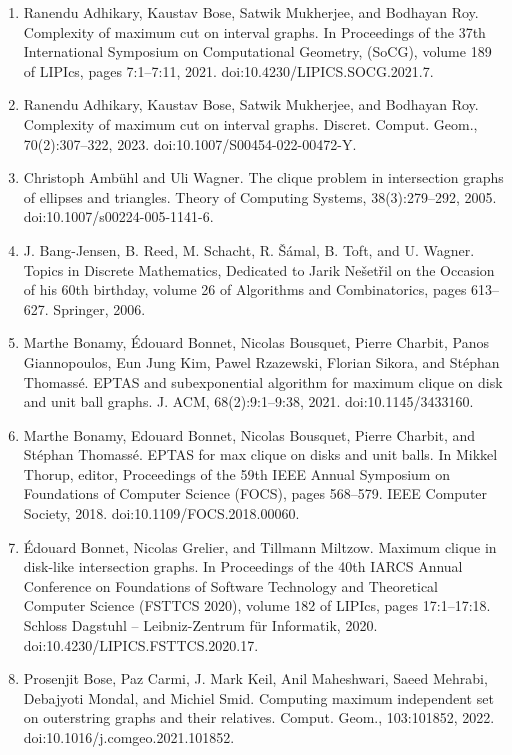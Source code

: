 \documentclass[10pt,a4paper]{amsart}
\begin{document}
\begin{enumerate}
\item[]  [1]  Ranendu Adhikary, Kaustav Bose, Satwik Mukherjee, and Bodhayan Roy.  Complexity of maximum cut on interval graphs.  In Proceedings of the 37th International Symposium on Computational Geometry, (SoCG), volume 189 of LIPIcs, pages 7:1–7:11, 2021.  doi:10.4230/LIPICS.SOCG.2021.7.  
\item[]  [2]  Ranendu Adhikary, Kaustav Bose, Satwik Mukherjee, and Bodhayan Roy.  Complexity of maximum cut on interval graphs.  Discret. Comput. Geom., 70(2):307–322, 2023.  doi:10.1007/S00454-022-00472-Y.  
\item[]  [3]  Christoph Ambühl and Uli Wagner.  The clique problem in intersection graphs of ellipses and triangles.  Theory of Computing Systems, 38(3):279–292, 2005.  doi:10.1007/s00224-005-1141-6.  
\item[]  [4]  J. Bang-Jensen, B. Reed, M. Schacht, R. Šámal, B. Toft, and U. Wagner.  Topics in Discrete Mathematics, Dedicated to Jarik Nešetřil on the Occasion of his 60th birthday, volume 26 of Algorithms and Combinatorics, pages 613–627.  Springer, 2006.  
\item[]  [5]  Marthe Bonamy, Édouard Bonnet, Nicolas Bousquet, Pierre Charbit, Panos Giannopoulos, Eun Jung Kim, Pawel Rzazewski, Florian Sikora, and Stéphan Thomassé.  EPTAS and subexponential algorithm for maximum clique on disk and unit ball graphs.  J. ACM, 68(2):9:1–9:38, 2021.  doi:10.1145/3433160.  
\item[]  [6]  Marthe Bonamy, Edouard Bonnet, Nicolas Bousquet, Pierre Charbit, and Stéphan Thomassé.  EPTAS for max clique on disks and unit balls.  In Mikkel Thorup, editor, Proceedings of the 59th IEEE Annual Symposium on Foundations of Computer Science (FOCS), pages 568–579. IEEE Computer Society, 2018.  doi:10.1109/FOCS.2018.00060.  
\item[]  [7]  Édouard Bonnet, Nicolas Grelier, and Tillmann Miltzow.  Maximum clique in disk-like intersection graphs.  In Proceedings of the 40th IARCS Annual Conference on Foundations of Software Technology and Theoretical Computer Science (FSTTCS 2020), volume 182 of LIPIcs, pages 17:1–17:18. Schloss Dagstuhl – Leibniz-Zentrum für Informatik, 2020.  doi:10.4230/LIPICS.FSTTCS.2020.17.  
\item[]  [8]  Prosenjit Bose, Paz Carmi, J. Mark Keil, Anil Maheshwari, Saeed Mehrabi, Debajyoti Mondal, and Michiel Smid.  Computing maximum independent set on outerstring graphs and their relatives.  Comput. Geom., 103:101852, 2022.  doi:10.1016/j.comgeo.2021.101852.  

\end{enumerate}
\end{document}
